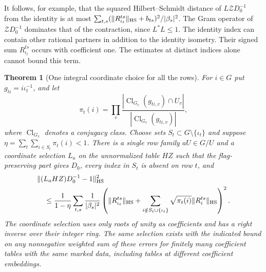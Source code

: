 \documentclass[a4paper,11pt]{article}
\newtheorem{theorem}[proposition]{Theorem}
\theoremstyle{definition}
\theoremstyle{remark}
\numberwithin{equation}{section}
\begin{document}
It follows, for example, that the squared Hilbert--Schmidt
distance of \(L\mathcal ZD_0^{-1}\) from the identity is at most
\(\sum_{t,s}(\|R_{\iota_t}^{ts}\|_{\rm HS}+b_{ts})^2/|\beta_s|^2\).
The Gram operator of \(\mathcal ZD_0^{-1}\) dominates that of
the contraction, since \(L^*L\le1\). The identity index can
contain other rational partners in addition to the identity
isometry. Their signed sum \(R_{\iota_t}^{ts}\) occurs with
coefficient one. The estimates at distinct indices alone cannot
bound this term.

\begin{theorem}[One integral coordinate choice for all the rows]
\leavevmode\label{thm:integralfamily551}
For \(i\in G\) put \(g_{ti}=i\iota_t^{-1}\), and let
\[
 \pi_t(i)=\prod_v
 \frac{|\operatorname{Cl}_{G_v}(g_{ti,v})\cap U_v|}
      {|\operatorname{Cl}_{G_v}(g_{ti,v})|},
\]
where \(\operatorname{Cl}_{G_v}\) denotes a conjugacy class.
Choose sets \(S_t\subset G\setminus\{\iota_t\}\) and suppose
\(\eta=\sum_t\sum_{i\in S_t}\pi_t(i)<1\).
There is a single row family \(aU\in G/U\) and a coordinate
selection \(L_a\) on the \emph{unnormalized} table \(HZ\) such
that the flag-preserving part gives \(D_0\), every index in
\(S_t\) is absent on row \(t\), and
\[
\begin{split}
 &\|(L_a HZ)D_0^{-1}-1\|_{\rm HS}^2\\
 &\quad\le\frac1{1-\eta}\sum_{t,s}\frac1{|\beta_s|^2}
 \left(\|R_{\iota_t}^{ts}\|_{\rm HS}
  +\sum_{i\notin S_t\cup\{\iota_t\}}\sqrt{\pi_t(i)}
                                         \|R_i^{ts}\|_{\rm HS}\right)^2 .
\end{split}
\]
The coordinate selection uses only roots of unity as coefficients
and has a right inverse over their integer ring. The same
selection exists with the indicated bound on any nonnegative
weighted sum of these errors for finitely many coefficient
tables with the same marked data, including tables at different
coefficient embeddings.
\end{theorem}
\end{document}
